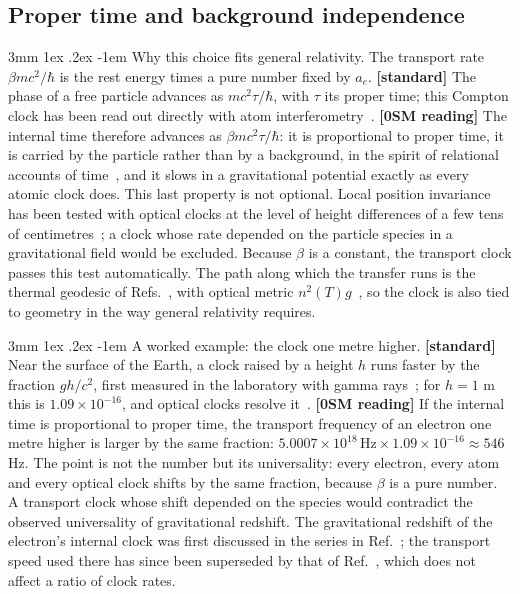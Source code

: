 \documentclass[%
 reprint, amsmath,amssymb, aps, prb, ]{revtex4-2}
\makeatletter
\numberwithin{equation}{section}
\renewcommand\paragraph{%
  \@startsection{paragraph}{4}{\z@}%
    {3mm \@plus 1ex \@minus .2ex}%
    {-1em}%
    {\normalfont\normalsize\itshape}}
\makeatother
\begin{document}
\subsection{Proper time and background independence}

\paragraph{Why this choice fits general relativity.} The transport rate $\beta mc^2/\hbar$ is the rest energy times a pure number fixed by $a_e$. \textbf{[standard]} The phase of a free particle advances as $mc^2\tau/\hbar$, with $\tau$ its proper time; this Compton clock has been read out directly with atom interferometry~\cite{ref:lan13}. \textbf{[0SM reading]} The internal time therefore advances as $\beta mc^2\tau/\hbar$: it is proportional to proper time, it is carried by the particle rather than by a background, in the spirit of relational accounts of time~\cite{ref:pagewootters,ref:rovelli}, and it slows in a gravitational potential exactly as every atomic clock does. This last property is not optional. Local position invariance~\cite{ref:will14} has been tested with optical clocks at the level of height differences of a few tens of centimetres~\cite{ref:chou10}; a clock whose rate depended on the particle species in a gravitational field would be excluded. Because $\beta$ is a constant, the transport clock passes this test automatically. The path along which the transfer runs is the thermal geodesic of Refs.~\cite{ref:p24,ref:p51}, with optical metric $n^2(T)g$~\cite{ref:gordon23}, so the clock is also tied to geometry in the way general relativity requires.

\paragraph{A worked example: the clock one metre higher.} \textbf{[standard]} Near the surface of the Earth, a clock raised by a height $h$ runs faster by the fraction $gh/c^2$, first measured in the laboratory with gamma rays~\cite{ref:pound}; for $h=1$ m this is $1.09\times10^{-16}$, and optical clocks resolve it~\cite{ref:chou10}. \textbf{[0SM reading]} If the internal time is proportional to proper time, the transport frequency of an electron one metre higher is larger by the same fraction: $5.0007\times10^{18}\,\mathrm{Hz}\times1.09\times10^{-16}\approx546$ Hz. The point is not the number but its universality: every electron, every atom and every optical clock shifts by the same fraction, because $\beta$ is a pure number. A transport clock whose shift depended on the species would contradict the observed universality of gravitational redshift. The gravitational redshift of the electron's internal clock was first discussed in the series in Ref.~\cite{ref:p22}; the transport speed used there has since been superseded by that of Ref.~\cite{ref:p10}, which does not affect a ratio of clock rates.
\end{document}
